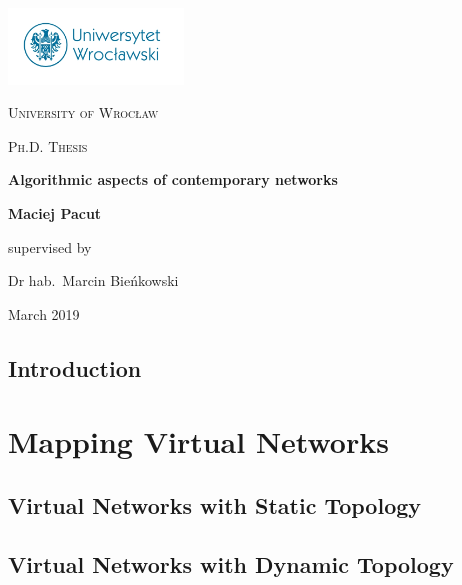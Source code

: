 \documentclass[a4paper,11pt]{book}
\author{Maciej Pacut}
\begin{document}
\begin{titlepage}
	\centering
	\includegraphics[width=0.35\textwidth]{figs/uni-logo.jpg}\par\vspace{1cm}
	{\scshape\LARGE University of Wrocław\par}
	\vspace{3cm}
        {\scshape\Large Ph.D. Thesis\par}
	\vspace{1cm}
        {\huge\bfseries Algorithmic aspects of contemporary networks\par}
	\vspace{3cm}
        {\huge \bfseries Maciej Pacut\par}
	\vfill
	supervised by\par
	Dr hab.~Marcin Bieńkowski

	\vfill

	{\large March 2019 \par}
\end{titlepage}

\newpage
\thispagestyle{empty}
\mbox{}

\tableofcontents


\chapter{Introduction}



\part{Mapping Virtual Networks}
\label{pt:virtual-networks}

\chapter{Virtual Networks with Static Topology}
\label{ch:static-mapping}



\chapter{Virtual Networks with Dynamic Topology}
\label{ch:dynamic-mapping}
\end{document}
